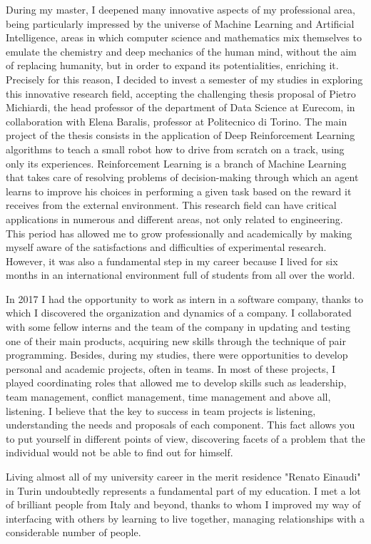 \documentclass[11pt, a4paper]{awesome-cv}
\begin{document}
\begin{cvletter}
During my master, I deepened many innovative aspects of my professional area, being particularly impressed by the universe of Machine Learning and Artificial Intelligence, areas in which computer science and mathematics mix themselves to emulate the chemistry and deep mechanics of the human mind, without the aim of replacing humanity, but in order to expand its potentialities, enriching it.
Precisely for this reason, I decided to invest a semester of my studies in exploring this innovative research field, accepting the challenging thesis proposal of Pietro Michiardi, the head professor of the department of Data Science at Eurecom, in collaboration with Elena Baralis, professor at Politecnico di Torino.
The main project of the thesis consists in the application of Deep Reinforcement Learning algorithms to teach a small robot how to drive from scratch on a track, using only its experiences. Reinforcement Learning is a branch of Machine Learning that takes care of resolving problems of decision-making through which an agent learns to improve his choices in performing a given task based on the reward it receives from the external environment. This research field can have critical applications in numerous and different areas, not only related to engineering. 
This period has allowed me to grow professionally and academically by making myself aware of the satisfactions and difficulties of experimental research. However, it was also a fundamental step in my career because I lived for six months in an international environment full of students from all over the world.

In 2017 I had the opportunity to work as intern in a software company, thanks to which I discovered the organization and dynamics of a company. I collaborated with some fellow interns and the team of the company in updating and testing one of their main products, acquiring new skills through the technique of pair programming.
Besides, during my studies, there were opportunities to develop personal and academic projects, often in teams. In most of these projects, I played coordinating roles that allowed me to develop skills such as leadership, team management, conflict management, time management and above all, listening. I believe that the key to success in team projects is listening, understanding the needs and proposals of each component. This fact allows you to put yourself in different points of view, discovering facets of a problem that the individual would not be able to find out for himself.

Living almost all of my university career in the merit residence "Renato Einaudi" in Turin undoubtedly represents a fundamental part of my education. I met a lot of brilliant people from Italy and beyond, thanks to whom I improved my way of interfacing with others by learning to live together, managing relationships with a considerable number of people.


\end{cvletter}
\end{document}
